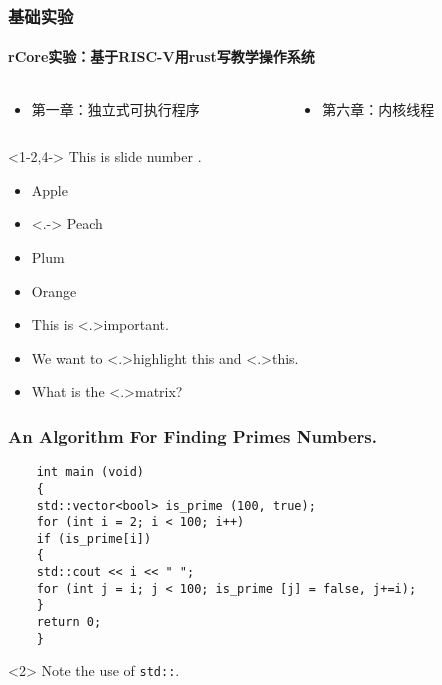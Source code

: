 \begin{frame}
	\frametitle{基础实验}
	\framesubtitle{rCore实验：基于RISC-V用rust写教学操作系统} \pause

	\begin{columns}

		\begin{column}{0.5\textwidth}
			\begin{itemize}
				\item 第一章：独立式可执行程序
			\end{itemize}
		\end{column}
		
		\begin{column}{0.5\textwidth}
			\begin{itemize}
				\item 第六章：内核线程
			\end{itemize}
		\end{column}
		
	\end{columns}

\end{frame}


\begin{frame}<1-2,4->
	This is slide number \only<3>{3}%
	\only<5>{5}.
\end{frame}

\begin{frame}

\begin{itemize}[<+->]
	\item Apple
	\item<.-> Peach
	\item Plum
	\item Orange
\end{itemize}
\end{frame}


\begin{itemize}[<+->]
	\item This is \alert<.>{important}.
	\item We want to \alert<.>{highlight} this and \alert<.>{this}.
	\item What is the \alert<.>{matrix}?
\end{itemize}



\begin{frame}[fragile]
	\frametitle{An Algorithm For Finding Primes Numbers.}
	\begin{verbatim}
	int main (void)
	{
	std::vector<bool> is_prime (100, true);
	for (int i = 2; i < 100; i++)
	if (is_prime[i])
	{
	std::cout << i << " ";
	for (int j = i; j < 100; is_prime [j] = false, j+=i);
	}
	return 0;
	}
	\end{verbatim}
	\begin{uncoverenv}
		Note the use of \verb|std::|.
	\end{uncoverenv}
\end{frame}

